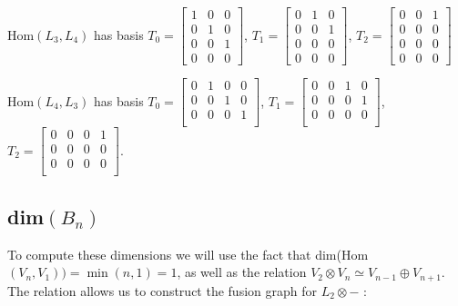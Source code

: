 \documentclass[11pt]{article} %
\begin{document}
 Hom$(L_3,L_4)$ has basis $T_0 = \begin{bmatrix}
 1 & 0 & 0 \\
 0 & 1 & 0 \\
 0 & 0 & 1 \\
 0 & 0 & 0 
\end{bmatrix}$, $T_1 = \begin{bmatrix}
 0 & 1 & 0 \\
 0 & 0 & 1 \\
0 & 0 & 0 \\
 0 & 0 & 0 
\end{bmatrix}$, $T_2 = \begin{bmatrix}
 0 & 0 & 1 \\
 0 & 0 & 0 \\
 0 & 0 & 0 \\
 0 & 0 & 0
\end{bmatrix}$

 Hom$(L_4,L_3)$ has basis $T_0 = \begin{bmatrix}
 0 & 1 & 0 & 0 \\
 0 & 0 & 1 & 0 \\
 0 & 0 & 0 & 1 \\
\end{bmatrix}$, $T_1 = \begin{bmatrix}
 0 & 0 & 1 & 0 \\
 0 & 0 & 0 & 1 \\
 0 & 0 & 0 & 0 \\
\end{bmatrix}$, $T_2 = \begin{bmatrix}
 0 & 0 & 0 & 1 \\
 0 & 0 & 0 & 0 \\
 0 & 0 & 0 & 0 \\
\end{bmatrix}$.


\subsection{dim$(B_n)$}
To compute these dimensions we will use the fact that dim(Hom$(V_n,V_1)) = \min(n,1) = 1$, as well as the relation  $V_2 \otimes V_n \simeq V_{n-1} \oplus V_{n+1}$. The relation allows us to construct the fusion graph for $L_2 \otimes -$ :
\end{document}
